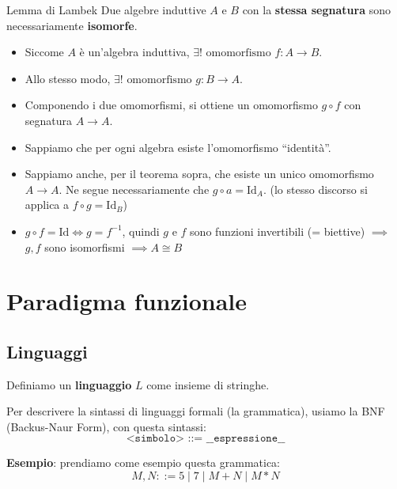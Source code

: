 \documentclass[a4paper,11pt]{report}
\begin{document}
\begin{thmframe}{Lemma di Lambek}{}
    Due algebre induttive \( A \) e \( B \) con la \textbf{stessa segnatura} sono necessariamente \textbf{isomorfe}.
\end{thmframe}
    \begin{proofframe}{}
        \begin{itemize}
            \item Siccome \( A \) è un'algebra induttiva, \( \exists! \text{ omomorfismo } f : A \to B \). 
            \item Allo stesso modo, \( \exists! \text{ omomorfismo } g : B \to A \).
            \item Componendo i due omomorfismi, si ottiene un omomorfismo \( g \circ f \) con segnatura \( A \to A \). 

            \item Sappiamo che per ogni algebra esiste l'omomorfismo ``identità''.
            \item Sappiamo anche, per il teorema sopra, che esiste un unico omomorfismo \( A \to A \). 
                \subitem Ne segue necessariamente che \( g \circ a = \text{Id}_A \). {\small (lo stesso discorso si applica a \( f \circ g = \text{Id}_B \))}

            \item  \( g \circ f = \text{Id} \iff g = f^{-1}\), quindi \( g \) e \( f \) sono funzioni invertibili (= biettive) \( \implies \) \( g, f \) sono isomorfismi \( \implies A \cong B\)  

        \end{itemize}

    \end{proofframe}

\chapter{Paradigma funzionale}

\section{Linguaggi}
Definiamo un \textbf{linguaggio} \( L \) come insieme di stringhe. 

Per descrivere la sintassi di linguaggi formali (la grammatica), usiamo la BNF (Backus-Naur Form), con questa sintassi:
\[
    \texttt{<simbolo> ::= \_\_espressione\_\_}
\]

\textbf{Esempio}:
prendiamo come esempio questa grammatica:
\[
    M, N ::= 5 \mid 7 \mid M + N \mid M * N
\]
\end{document}
